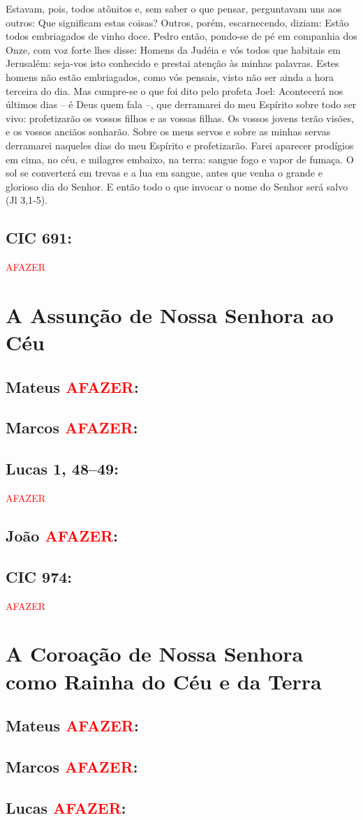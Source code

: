 \documentclass[10pt,a5paper]{book}
\newcommand{\from}[1]{\subsection*{#1}}
\newcommand{\TODO}{\textcolor{red}{\ttfamily AFAZER}}
\begin{document}
Estavam, pois, todos atônitos e, sem saber o que pensar, perguntavam uns aos outros:
Que significam estas coisas?
Outros, porém, escarnecendo, diziam:
Estão todos embriagados de vinho doce.
Pedro então, pondo-se de pé em companhia dos Onze, com voz forte lhes disse:
Homens da Judéia e vós todos que habitais em Jerusalém:
seja-vos isto conhecido e prestai atenção às minhas palavras.
Estes homens não estão embriagados, como vós pensais, visto não ser ainda a hora terceira do dia.
Mas cumpre-se o que foi dito pelo profeta Joel:
Acontecerá nos últimos dias -- é Deus quem fala --, que derramarei do meu Espírito sobre todo ser vivo:
profetizarão os vossos filhos e as vossas filhas.
Os vossos jovens terão visões, e os vossos anciãos sonharão.
Sobre os meus servos e sobre as minhas servas derramarei naqueles dias do meu Espírito e profetizarão.
Farei aparecer prodígios em cima, no céu, e milagres embaixo, na terra:
sangue fogo e vapor de fumaça.
O sol se converterá em trevas e a lua em sangue, antes que venha o grande e glorioso dia do Senhor.
E então todo o que invocar o nome do Senhor será salvo (Jl 3,1-5).

\from{CIC 691:}

\TODO


\section{A Assunção de Nossa Senhora ao Céu}

\from{Mateus \TODO:}

\from{Marcos \TODO:}

\from{Lucas 1, 48--49:}

\TODO

\from{João \TODO:}

\from{CIC 974:}

\TODO


\section{A Coroação de Nossa Senhora como Rainha do Céu e da Terra}

\from{Mateus \TODO:}

\from{Marcos \TODO:}

\from{Lucas \TODO:}
\end{document}
